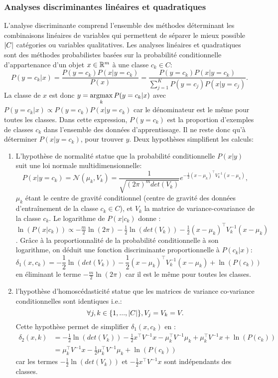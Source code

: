 \subsubsection{Analyses discriminantes linéaires et quadratiques}
L'analyse discriminante comprend l'ensemble des méthodes déterminant les combinaisons linéaires de variables qui permettent de séparer le mieux possible ${\vert C\vert}$ catégories ou variables qualitatives. Les analyses linéaires et quadratiques sont des méthodes probabilistes basées sur la probabilité conditionnelle d'appartenance d'un objet $x \in \mathbb{R}^m$ à une classe $c_k \in C$: \[P(y=c_k \vert x) = \frac{P(y=c_k) P(x \vert y=c_k)}{P(x)} = \frac{P(y=c_k) P(x \vert y=c_k)}{\sum\limits_{j = 1}^K P(y=c_j) P(x \vert y=c_j)}.\]
La classe de $x$ est donc $y = \mathop{\mathrm{argmax}}\limits_k P(y=c_k \vert x)$ avec $P(y=c_k \vert x) \propto P(y=c_k) P(x \vert y=c_k)$ car le dénominateur est le même pour toutes les classes. Dans cette expression, $P(y=c_k)$ est la proportion d'exemples de classes $c_k$ dans l'ensemble des données d'apprentissage. Il ne reste donc qu'à déterminer $P(x \vert y=c_k)$, pour trouver $y$. 
Deux hypothèses simplifient les calculs:
\begin{enumerate}
	\item L'hypothèse de normalité statue que la probabilité conditionnelle $P(x \vert y)$ suit une loi normale multidimensionnelle: \[P(x \vert y = c_k) = \mathcal{N}(\mu_k, V_k) = \frac{1}{\sqrt{(2\pi)^m det(V_k)}}e^{-\frac{1}{2}(x - \mu_k)^\top V_k^{-1}(x - \mu_k)}, \] $\mu_k$ étant le centre de gravité conditionnel (centre de gravité des données d'entraînement de la classe $c_k \in C$), et $V_k$ la matrice de variance-covariance de la classe $c_k$. Le logarithme de $P(x\vert c_k)$ donne :
	$\ln\left(P(x \vert c_k)\right) \propto -\frac{m}{2}\ln(2\pi) -\frac{1}{2} \ln(det(V_k)) -\frac{1}{2}(x - \mu_k)^\top V_k^{-1}(x - \mu_k)$ \citep{ghojogh2019ldaqdatutorial}. Grâce à la proportionnalité de la probabilité conditionnelle à son logarithme, on déduit une fonction discriminante proportionnelle à $P(c_k \vert x)$:
	\[\delta_1(x, c_k) = -\frac{1}{2} \ln(det(V_k)) -\frac{1}{2} (x-\mu_k)^\top V_k^{-1}(x-\mu_k) + \ln(P(c_k)) \]
	en éliminant le terme $-\frac{m}{2}\ln(2\pi)$ car il est le même pour toutes les classes.
	\item l'hypothèse d'homoscédasticité statue que les matrices de variance co-variance conditionnelles sont identiques i.e.: \[\forall j, k \in \lbrace 1,...,{\vert C\vert} \rbrace, V_j = V_k = V.\] Cette hypothèse permet de simplifier $\delta_1(x, c_k)$ en :
	\[\begin{array}{rl}
	\delta_2(x,k) & = -\frac{1}{2} \ln(det(V_k)) -\frac{1}{2} x^\top V^{-1} x - \mu_k^\top V^{-1} \mu_k + \mu_k^\top V^{-1} x+ \ln(P(c_k))\\
	 & = \mu_k^\top V^{-1} x - \frac{1}{2} \mu_k^\top V^{-1}\mu_k +\ln(P(c_k))
	\end{array} \]
	car les termes $-\frac{1}{2} \ln(det(V_k))$ et $-\frac{1}{2}  x^\top V^{-1} x$ sont indépendants des classes.
\end{enumerate}


